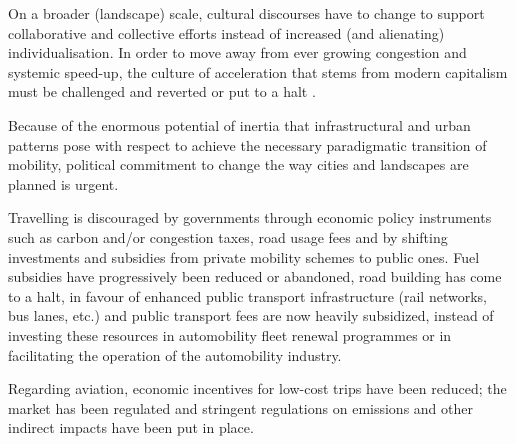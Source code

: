 

On a broader (landscape) scale, cultural discourses have to change to support collaborative and collective efforts instead of increased (and alienating) individualisation. In order to move away from ever growing congestion and systemic speed-up, the culture of acceleration that stems from modern capitalism must be challenged and reverted or put to a halt \textcite{zijlstra2012_SocioSpatialPerspective}.

Because of the enormous potential of inertia that infrastructural and urban patterns pose with respect to achieve the necessary paradigmatic transition of mobility, political commitment to change the way cities and landscapes are planned is urgent.

Travelling is discouraged by governments through economic policy instruments such as carbon and/or congestion taxes, road usage fees and by shifting investments and subsidies from private mobility schemes to public ones. Fuel subsidies have progressively been reduced or abandoned, road building has come to a halt, in favour of enhanced public transport infrastructure (rail networks, bus lanes, etc.) and public transport fees are now heavily subsidized, instead of investing these resources in automobility fleet renewal programmes or in facilitating the operation of the automobility industry.

Regarding aviation, economic incentives for low-cost trips have been reduced; the market has been regulated and stringent regulations on emissions and other indirect impacts have been put in place.
